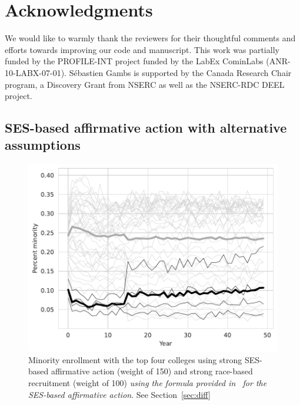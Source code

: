 \section*{Acknowledgments}

We would like to warmly thank the reviewers for their thoughtful comments and efforts towards improving our code and manuscript.
This work was partially funded by the PROFILE-INT project funded by the LabEx CominLabs (ANR-10-LABX-07-01).
Sébastien Gambs is supported by the Canada Research Chair program, a Discovery Grant from NSERC as well as the NSERC-RDC DEEL project.

\clearpage

\begin{appendices}

\section{SES-based affirmative action with alternative assumptions}

\begin{figure}[H]
  \centering
  \includegraphics[width=.79\textwidth]{figures/figC4_f1.pdf}
  \caption{Minority enrollment with the top four colleges using strong SES-based affirmative action (weight of 150) and strong race-based recruitment (weight of 100) \emph{using the formula provided in~\cite{reardon2018levels} for the SES-based affirmative action}. See Section~\ref{sec:diff}}
  \label{fig:c4_f1}
\end{figure}


\end{appendices}
